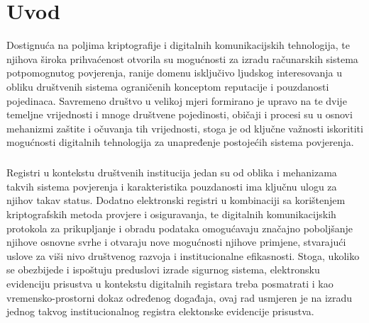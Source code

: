 \chapter{Uvod}
Dostignuća na poljima kriptografije i digitalnih komunikacijskih tehnologija, te njihova široka prihvaćenost otvorila su mogućnosti za izradu računarskih sistema potpomognutog povjerenja, ranije domenu isključivo ljudskog interesovanja u obliku društvenih sistema ograničenih konceptom reputacije i pouzdanosti pojedinaca. Savremeno društvo u velikoj mjeri formirano je upravo na te dvije temeljne vrijednosti i mnoge društvene pojedinosti, običaji i procesi su u osnovi mehanizmi zaštite i očuvanja tih vrijednosti, stoga je od ključne važnosti iskorititi mogućnosti digitalnih tehnologija za unapređenje postojećih sistema povjerenja.

\paragraph*{}
Registri u kontekstu društvenih institucija jedan su od oblika i mehanizama takvih sistema povjerenja i karakteristika pouzdanosti ima ključnu ulogu za njihov takav status. Dodatno elektronski registri u kombinaciji sa korištenjem kriptografskih metoda provjere i osiguravanja, te digitalnih komunikacijskih protokola za prikupljanje i obradu podataka omogućavaju značajno poboljšanje njihove osnovne svrhe i otvaraju nove mogućnosti njihove primjene, stvarajući uslove za viši nivo društvenog razvoja i institucionalne efikasnosti. Stoga, ukoliko se obezbijede i ispoštuju preduslovi izrade sigurnog sistema, elektronsku evidenciju prisustva u kontekstu digitalnih registara treba posmatrati i kao vremensko-prostorni dokaz određenog događaja, ovaj rad usmjeren je na izradu jednog takvog institucionalnog registra elektonske evidencije prisustva.